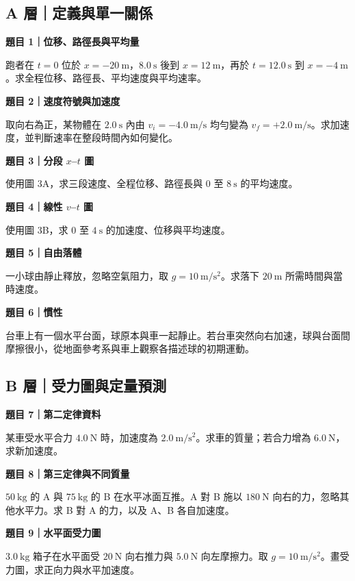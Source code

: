 \documentclass[11pt,a4paper]{article}
\begin{document}
\subsection{A 層｜定義與單一關係}\label{a-ux5c64ux5b9aux7fa9ux8207ux55aeux4e00ux95dcux4fc2}

\textbf{題目 1｜位移、路徑長與平均量}

跑者在 \(t=0\) 位於 \(x=-20\ \mathrm m\)，\(8.0\ \mathrm s\) 後到 \(x=12\ \mathrm m\)，再於 \(t=12.0\ \mathrm s\) 到 \(x=-4\ \mathrm m\)。求全程位移、路徑長、平均速度與平均速率。

\textbf{題目 2｜速度符號與加速度}

取向右為正，某物體在 \(2.0\ \mathrm s\) 內由 \(v_i=-4.0\ \mathrm{m/s}\) 均勻變為 \(v_f=+2.0\ \mathrm{m/s}\)。求加速度，並判斷速率在整段時間內如何變化。

\textbf{題目 3｜分段 \(x\)--\(t\) 圖}

使用圖 3A，求三段速度、全程位移、路徑長與 \(0\) 至 \(8\ \mathrm s\) 的平均速度。

\textbf{題目 4｜線性 \(v\)--\(t\) 圖}

使用圖 3B，求 \(0\) 至 \(4\ \mathrm s\) 的加速度、位移與平均速度。

\textbf{題目 5｜自由落體}

一小球由靜止釋放，忽略空氣阻力，取 \(g=10\ \mathrm{m/s^2}\)。求落下 \(20\ \mathrm m\) 所需時間與當時速度。

\textbf{題目 6｜慣性}

台車上有一個水平台面，球原本與車一起靜止。若台車突然向右加速，球與台面間摩擦很小，從地面參考系與車上觀察各描述球的初期運動。

\subsection{B 層｜受力圖與定量預測}\label{b-ux5c64ux53d7ux529bux5716ux8207ux5b9aux91cfux9810ux6e2c}

\textbf{題目 7｜第二定律資料}

某車受水平合力 \(4.0\ \mathrm N\) 時，加速度為 \(2.0\ \mathrm{m/s^2}\)。求車的質量；若合力增為 \(6.0\ \mathrm N\)，求新加速度。

\textbf{題目 8｜第三定律與不同質量}

\(50\ \mathrm{kg}\) 的 A 與 \(75\ \mathrm{kg}\) 的 B 在水平冰面互推。A 對 B 施以 \(180\ \mathrm N\) 向右的力，忽略其他水平力。求 B 對 A 的力，以及 A、B 各自加速度。

\textbf{題目 9｜水平面受力圖}

\(3.0\ \mathrm{kg}\) 箱子在水平面受 \(20\ \mathrm N\) 向右推力與 \(5.0\ \mathrm N\) 向左摩擦力。取 \(g=10\ \mathrm{m/s^2}\)。畫受力圖，求正向力與水平加速度。
\end{document}
